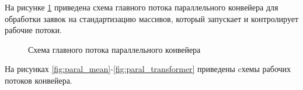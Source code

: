 На рисунке \ref{fig:parallel} приведена схема главного потока параллельного конвейера для обработки заявок на стандартизацию массивов, который запускает и контролирует рабочие потоки.

\newpage
\begin{figure}[h!]
	
	
	\caption{Схема главного потока параллельного конвейера}
	
	\label{fig:parallel}
	
\end{figure}

\newpage
На рисунках \ref{fig:paral_mean}-\ref{fig:paral_transformer} приведены cхемы рабочих потоков конвейера.


